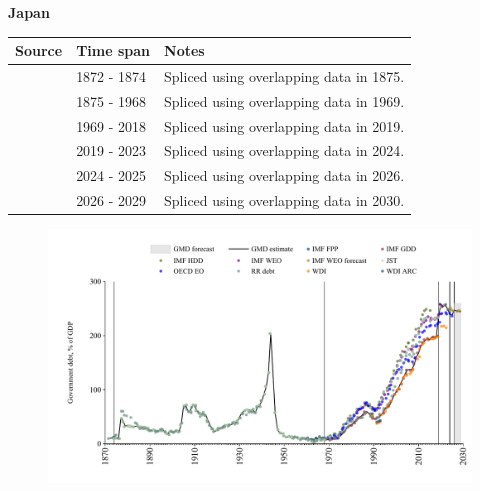 \documentclass[12pt,a4paper,landscape]{article}
\begin{document}
\begin{adjustbox}{max totalsize={\paperwidth}{\paperheight},center}
\begin{minipage}[t][\textheight][t]{\textwidth}
\vspace*{0.5cm}
{}
\begin{center}
{\Large\bfseries Japan}
\end{center}
\vspace{0.5cm}
\begin{table}[H]
\centering
\small
\begin{tabular}{|l|l|l|}
\hline
\textbf{Source} & \textbf{Time span} & \textbf{Notes} \\
\hline
\rowcolor{white}\cite{RR_debt}& 1872 - 1874 &Spliced using overlapping data in 1875.\\
\rowcolor{lightgray}\cite{IMF_FPP}& 1875 - 1968 &Spliced using overlapping data in 1969.\\
\rowcolor{white}\cite{IMF_GDD}& 1969 - 2018 &Spliced using overlapping data in 2019.\\
\rowcolor{lightgray}\cite{IMF_FPP}& 2019 - 2023 &Spliced using overlapping data in 2024.\\
\rowcolor{white}\cite{OECD_EO}& 2024 - 2025 &Spliced using overlapping data in 2026.\\
\rowcolor{lightgray}\cite{IMF_WEO_forecast}& 2026 - 2029 &Spliced using overlapping data in 2030.\\
\hline
\end{tabular}
\end{table}
\begin{figure}[H]
\centering
\includegraphics[width=\textwidth,height=0.6\textheight,keepaspectratio]{graphs/JPN_govdebt_GDP.pdf}
\end{figure}
\end{minipage}
\end{adjustbox}
\end{document}
